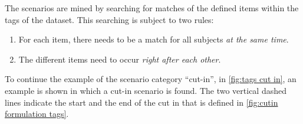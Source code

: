 The scenarios are mined by searching for matches of the defined items within the tags of the dataset. 
This searching is subject to two rules:
\begin{enumerate}
	\item For each item, there needs to be a match for all subjects \emph{at the same time}.
	\item The different items need to occur \emph{right after each other}. 
\end{enumerate}\cendb
\cstartd To continue the example of the scenario category ``cut-in'', in \cref{fig:tags cut in}, an example is shown in which a cut-in scenario is found. \cendd
\cstartb The two vertical dashed lines indicate the start and the end of the cut in that is defined in \cref{fig:cutin formulation tags}.
\cendb

\begin{figure*}
	\centering
	
	\caption{\cstartc Example of tags describing a cut in. Note that only the tags that are relevant for the cut in, as defined in \cref{fig:cutin formulation tags}, are shown.\cendc}
	\label{fig:tags cut in}
\end{figure*}



